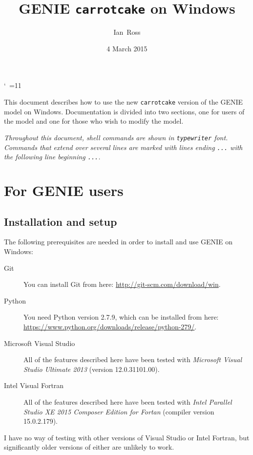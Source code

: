 \documentclass[a4paper,10pt,article]{memoir}
\title{GENIE \texttt{carrotcake} on Windows}
\author{Ian~Ross}
\date{4 March 2015}
\begin{document}
\catcode`~=11    %

\maketitle

This document describes how to use the new \texttt{carrotcake} version of
the GENIE model on Windows.  Documentation is divided into two
sections, one for users of the model and one for those who wish to
modify the model.

\emph{Throughout this document, shell commands are shown in
  \texttt{typewriter} font.  Commands that extend over several lines
  are marked with lines ending \texttt{...} with the following line
  beginning \texttt{...}.}

\chapter{For GENIE users}

\section{Installation and setup}

The following prerequisites are needed in order to install and use
GENIE on Windows:
\begin{description}
  \item[Git]{You can install Git from here:
    \url{http://git-scm.com/download/win}.}
  \item[Python]{You need Python version 2.7.9, which can be installed
    from here:
    \url{https://www.python.org/downloads/release/python-279/}.}
  \item[Microsoft Visual Studio]{All of the features described here
    have been tested with \emph{Microsoft Visual Studio Ultimate 2013}
    (version 12.0.31101.00).}
  \item[Intel Visual Fortran]{All of the features described here have
    been tested with \emph{Intel Parallel Studio XE 2015 Composer
      Edition for Fortan} (compiler version 15.0.2.179).}
\end{description}

I have no way of testing with other versions of Visual Studio or Intel
Fortran, but significantly older versions of either are unlikely to
work.
\end{document}
